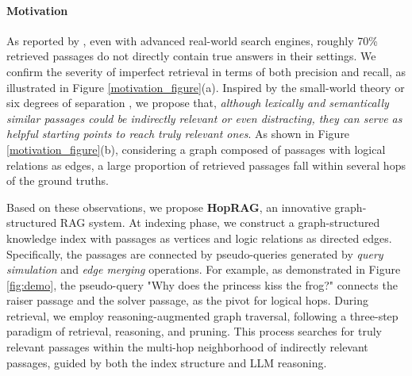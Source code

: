 \paragraph{Motivation} As reported by \citep{wang2024astute}, even with advanced real-world search engines, roughly 70\% retrieved passages do not directly contain true answers in their settings. We confirm the severity of imperfect retrieval in terms of both precision and recall, as illustrated in Figure \ref{motivation_figure}(a). Inspired by the small-world theory \citep{kleinberg2000small} or six degrees of separation \citep{guare2016six}, we propose that, \textit{although lexically and semantically similar passages could be indirectly relevant or even distracting, they can serve as helpful starting points to reach truly relevant ones}. As shown in Figure \ref{motivation_figure}(b), considering a graph composed of passages with logical relations as edges, a large proportion of retrieved passages fall within several hops of the ground truths. 

Based on these observations, we propose \textbf{HopRAG}, an innovative graph-structured RAG system. At indexing phase, we construct a graph-structured knowledge index with passages as vertices and logic relations as directed edges. Specifically, the passages are connected by pseudo-queries generated by \textit{query simulation} and \textit{edge merging} operations. For example, as demonstrated in Figure \ref{fig:demo}, the pseudo-query "Why does the princess kiss the frog?" connects the raiser passage and the solver passage, as the pivot for logical hops. During retrieval, we employ reasoning-augmented graph traversal, following a three-step paradigm of retrieval, reasoning, and pruning. This process searches for truly relevant passages within the multi-hop neighborhood of indirectly relevant passages, guided by both the index structure and LLM reasoning.


